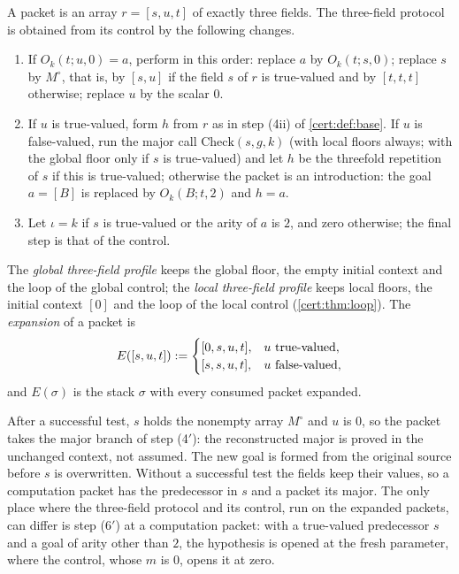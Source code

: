 \begin{definition}\label{cert:def:three-field}
A packet is an array $r=[s,u,t]$ of exactly three fields. The three-field
protocol is obtained from its control by the following changes.
\begin{enumerate}
\item[(3$'$)] If $O_k(t;u,0)=a$, perform in this order: replace $a$ by
$O_k(t;s,0)$; replace $s$ by $M^{\circ}$, that is, by $[s,u]$ if the field $s$
of $r$ is true-valued and by $[t,t,t]$ otherwise; replace $u$ by the scalar
$0$.
\item[(4$'$)] If $u$ is true-valued, form $h$ from $r$ as in step (4ii) of
\cref{cert:def:base}. If $u$ is false-valued, run the major call
$\mathrm{Check}(s,g,k)$ (with local floors always; with the global floor only
if $s$ is true-valued) and let $h$ be the threefold repetition of $s$ if this
is true-valued; otherwise the packet is an introduction: the goal $a=[B]$ is
replaced by $O_k(B;t,2)$ and $h=a$.
\item[(6$'$)] Let $\iota=k$ if $s$ is true-valued or the arity of $a$ is $2$,
and zero otherwise; the final step is that of the control.
\end{enumerate}
The \emph{global three-field profile} keeps the global floor, the empty initial
context and the loop of the global control; the \emph{local three-field
profile} keeps local floors, the initial context $[0]$ and the loop of the
local control (\cref{cert:thm:loop}). The \emph{expansion} of a packet is
\[
E([s,u,t])\mathrel{:=}
\begin{cases}
[0,s,u,t], & u\text{ true-valued},\\
[s,s,u,t], & u\text{ false-valued},
\end{cases}
\]
and $E(\sigma)$ is the stack $\sigma$ with every consumed packet expanded.
\end{definition}

After a successful test, $s$ holds the nonempty array $M^{\circ}$ and $u$ is
$0$, so the packet takes the major branch of step (4$'$): the reconstructed
major is proved in the unchanged context, not assumed. The new goal is formed
from the original source before $s$ is overwritten. Without a successful test
the fields keep their values, so a computation packet has the predecessor in
$s$ and a  packet its major. The only place where the three-field
protocol and its control, run on the expanded packets, can differ is
step (6$'$) at a computation packet: with a true-valued predecessor $s$ and a
goal of arity other than $2$, the hypothesis is opened at the fresh parameter,
where the control, whose $m$ is $0$, opens it at zero.

